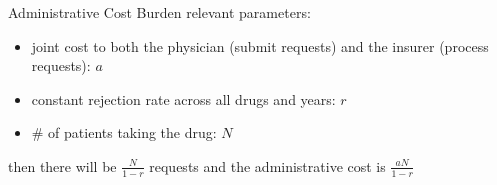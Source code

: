 \begin{frame}{Administrative Cost Burden}
    relevant parameters:
    \begin{itemize}
        \item joint cost to both the physician (submit requests) and the insurer (process requests): $a$
        \item constant rejection rate across all drugs and years: $r$
        \item \# of patients taking the drug: $N$
    \end{itemize}    
    then there will be $\frac{N}{1-r}$ requests and the administrative cost is $\frac{aN}{1-r}$ \\
\end{frame}